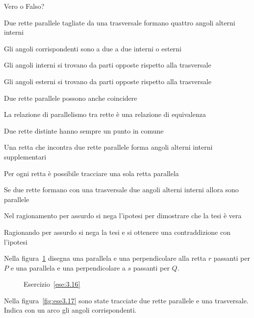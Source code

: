 \begin{esercizio}
\label{ese:3.15}
Vero o Falso?
\begin{enumeratea}
\item Due rette parallele tagliate da una trasversale formano quattro angoli alterni interni\tab\hfill\boxV\quad\boxF
\item Gli angoli corrispondenti sono a due a due interni o esterni\hfill\boxV\quad\boxF
\item Gli angoli interni si trovano da parti opposte rispetto alla trasversale\hfill\boxV\quad\boxF
\item Gli angoli esterni si trovano da parti opposte rispetto alla trasversale\hfill\boxV\quad\boxF
\item Due rette parallele possono anche coincidere\hfill\boxV\quad\boxF
\item La relazione di parallelismo tra rette è una relazione di equivalenza\hfill\boxV\quad\boxF
\item Due rette distinte hanno sempre un punto in comune\hfill\boxV\quad\boxF
\item Una retta che incontra due rette parallele forma angoli alterni interni supplementari\tab\hfill\boxV\quad\boxF
\item Per ogni retta è possibile tracciare una sola retta parallela\hfill\boxV\quad\boxF
\item Se due rette formano con una trasversale due angoli alterni interni allora sono parallele\tab\hfill\boxV\quad\boxF
\item Nel ragionamento per assurdo si nega l'ipotesi per dimostrare che la tesi è vera\tab\tab\hfill\boxV\quad\boxF
\item Ragionando per assurdo si nega la tesi e si ottenere una contraddizione con l'ipotesi\tab\hfill\boxV\quad\boxF
\end{enumeratea}
\end{esercizio}

\begin{esercizio}
\label{ese:3.16}
Nella figura~\ref{fig:ese3.16} disegna una parallela e una perpendicolare alla retta $r$ passanti per $P$ e una parallela e una perpendicolare a $s$ passanti per $Q$.
\end{esercizio}

\begin{figure}[htb]
\centering
\caption{Esercizio~\ref{ese:3.16}}\label{fig:ese3.16}
\end{figure}

\begin{esercizio}
\label{ese:3.17}
Nella figura~\ref{fig:ese3.17} sono state tracciate due rette parallele e una trasversale. Indica con un arco gli angoli corrispondenti.
\end{esercizio}

